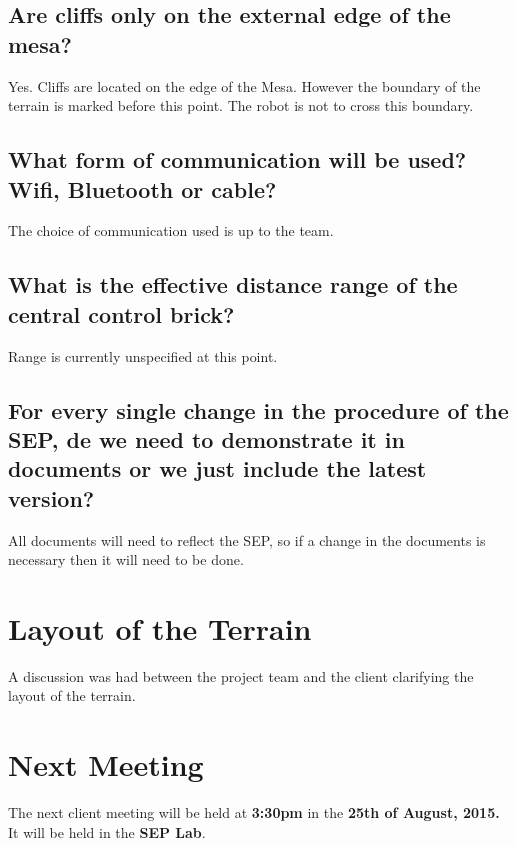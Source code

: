 \documentclass[a4paper]{article}
\begin{document}
\subsection{Are cliffs only on the external edge of the mesa?}
Yes. Cliffs are located on the edge of the Mesa. However the boundary of the terrain is marked before this point. The robot is not to cross this boundary.

\subsection{What form of communication will be used? Wifi, Bluetooth or cable?}
The choice of communication used is up to the team.

\subsection{What is the effective distance range of the central control brick?}
Range is currently unspecified at this point.

\subsection{For every single change in the procedure of the SEP, de we need to demonstrate it in documents or we just include the latest version?}
All documents will need to reflect the SEP, so if a change in the documents is necessary then it will need to be done.

\section{Layout of the Terrain}
A discussion was had between the project team and the client clarifying the layout of the terrain.

\section{Next Meeting}
The next client meeting will be held at \textbf{3:30pm} in the \textbf{25th of August, 2015.} It will be held in the \textbf{SEP Lab}.
\end{document}
